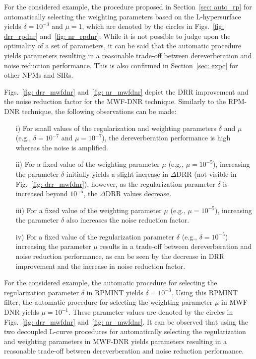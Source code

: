 \documentclass[10pt]{IEEEtran}
\begin{document}
For the considered example, the procedure proposed in Section~\ref{sec: auto_rp} for automatically selecting the weighting parameters based on the L-hypersurface yields $\delta = 10^{-3}$ and $\mu = 1$, which are denoted by the circles in Figs.~\ref{fig: drr_rpdnr} and~\ref{fig: nr_rpdnr}.
While it is not possible to judge upon the optimality of a set of parameters, it can be said that the automatic procedure yields parameters resulting in a reasonable trade-off between dereverberation and noise reduction performance.
This is also confirmed in Section~\ref{sec: expc} for other NPMs and SIRs.

Figs.~\ref{fig: drr_mwfdnr} and~\ref{fig: nr_mwfdnr} depict the DRR improvement and the noise reduction factor for the MWF-DNR technique. 
Similarly to the RPM-DNR technique, the following observations can be made:
\begin{itemize}
\item[i)] For small values of the regularization and weighting parameters $\delta$ and $\mu$ (e.g., $\delta = 10^{-7}$ and $\mu = 10^{-7}$), the dereverberation performance is high whereas the noise is amplified. 
\item[ii)] For a fixed value of the weighting parameter $\mu$ (e.g., $\mu = 10^{-5}$), increasing the parameter $\delta$ initially yields a slight increase in $\Delta$DRR (not visible in Fig.~\ref{fig: drr_mwfdnr}), however, as the regularization parameter $\delta$ is increased beyond $10^{-5}$, the $\Delta$DRR values decrease. 
\item[iii)] For a fixed value of the weighting parameter $\mu$ (e.g., $\mu = 10^{-5}$), increasing the parameter $\delta$ also increases the noise reduction factor. 
\item[iv)] For a fixed value of the regularization parameter $\delta$ (e.g., $\delta = 10^{-5}$) increasing the parameter $\mu$ results in a trade-off between dereverberation and noise reduction performance, as can be seen by the decrease in DRR improvement and the increase in noise reduction factor.
\end{itemize}
For the considered example, the automatic procedure for selecting the regularization parameter $\delta$ in RPMINT yields $\delta = 10^{-3}$. 
Using this RPMINT filter, the automatic procedure for selecting the weighting parameter $\mu$ in MWF-DNR yields $\mu = 10^{-1}$.
These parameter values are denoted by the circles in Figs.~\ref{fig: drr_mwfdnr} and~\ref{fig: nr_mwfdnr}.
It can be observed that using the two decoupled L-curve procedures for automatically selecting the regularization and weighting parameters in MWF-DNR yields parameters resulting in a reasonable trade-off between dereverberation and noise reduction performance.
\end{document}
